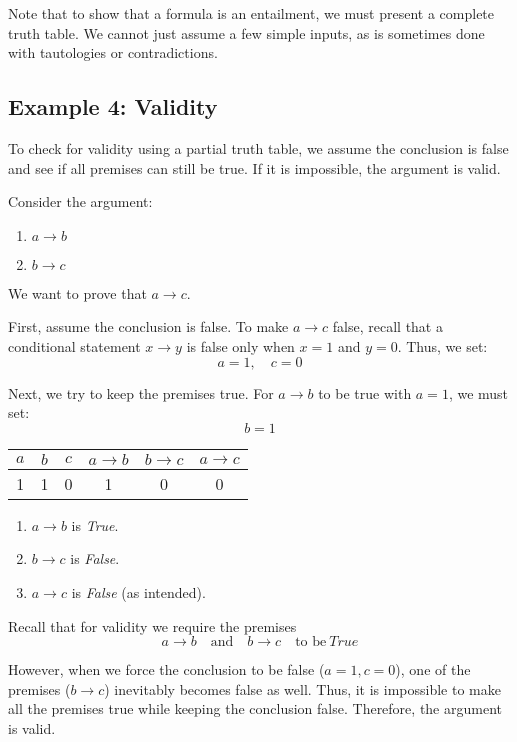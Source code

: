 \documentclass[12pt,a4paper,openany]{article}
\begin{document}
Note that to show that a formula is an entailment, we must present a complete truth table.
We cannot just assume a few simple inputs, as is sometimes done with tautologies or contradictions.

\subsection{Example 4: Validity}

To check for validity using a partial truth table, we assume the conclusion is false and see if all premises can still be true. If it is impossible, the argument is valid.

Consider the argument:
\begin{enumerate}
    \item $a \to b$
    \item $b \to c$
\end{enumerate}
We want to prove that $a \to c$.

First, assume the conclusion is false. To make $a \to c$ false, recall that a conditional statement $x \to y$ is false only when $x = 1$ and $y = 0$.
Thus, we set:
$$ a = 1, \quad c = 0 $$

Next, we try to keep the premises true. For $a \to b$ to be true with $a = 1$, we must set:
$$ b = 1 $$

\begin{center}
\begin{tabular}{|c|c|c|c|c|c|}
\hline
$a$ & $b$ & $c$ & $a \to b$ & $b \to c$ & $a \to c$ \\
\hline
\textcolor{truecolor}{1} & \textcolor{truecolor}{1} & \textcolor{falsecolor}{0} & \textcolor{truecolor}{1} & \textcolor{falsecolor}{0} & \textcolor{falsecolor}{0} \\
\hline
\end{tabular}
\end{center}

\begin{enumerate}
    \item $a \to b$ is \textit{True}.
    \item $b \to c$ is \textit{False}.
    \item $a \to c$ is \textit{False} (as intended).
\end{enumerate}

Recall that for validity we require the premises
$$a \to b \quad \text{and} \quad b \to c \quad \text{to be} \ \textit{True}$$

However, when we force the conclusion to be false ($a=1, c=0$), one of the premises ($b \to c$) inevitably becomes false as well. Thus, it is impossible to make all the premises true while keeping the conclusion false.
Therefore, the argument is valid.
\end{document}
